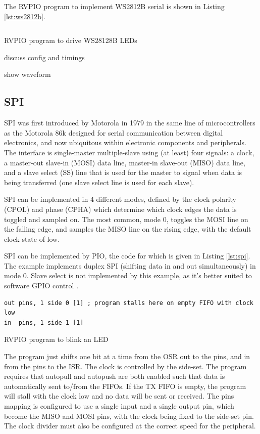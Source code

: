 The RVPIO program to implement WS2812B serial is shown in Listing \ref{lst:ws2812b}.

\begin{listing}[h!]
    \begin{verbatim}

    \end{verbatim}
    \caption{RVPIO program to drive WS28128B LEDs}
    \label{lst:ws2812b}
\end{listing}

discuss config and timings

show waveform


\subsection{SPI}

SPI was first introduced by Motorola in 1979 in the same line of microcontrollers as the Motorola 86k designed for serial communication between digital electronics, and now ubiquitous within electronic components and peripherals. The interface is single-master multiple-slave using (at least) four signals: a clock, a master-out slave-in (MOSI) data line, master-in slave-out (MISO) data line, and a slave select (SS) line that is used for the master to signal when data is being transferred (one slave select line is used for each slave).

SPI can be implemented in 4 different modes, defined by the clock polarity (CPOL) and phase (CPHA) which determine which clock edges the data is toggled and sampled on. The most common, mode 0, toggles the MOSI line on the falling edge, and samples the MISO line on the rising edge, with the default clock state of low.

SPI can be implemented by PIO, the code for which is given in Listing \ref{lst:spi}. The example implements duplex SPI (shifting data in and out simultaneously) in mode 0. Slave select is not implemented by this example, as it's better suited to software GPIO control \cite{rp2040}.

\begin{listing}[h!]
    \begin{verbatim}
out pins, 1 side 0 [1] ; program stalls here on empty FIFO with clock low
in  pins, 1 side 1 [1] 
    \end{verbatim}
    \caption{RVPIO program to blink an LED \cite{rp2040}}
    \label{lst:spi}
\end{listing}

The program just shifts one bit at a time from the OSR out to the pins, and in from the pins to the ISR. The clock is controlled by the side-set. The program requires that autopull and autopush are both enabled such that data is automatically sent to/from the FIFOs. If the TX FIFO is empty, the program will stall with the clock low and no data will be sent or received. The pins mapping is configured to use a single input and a single output pin, which become the MISO and MOSI pins, with the clock being fixed to the side-set pin. The clock divider must also be configured at the correct speed for the peripheral.

